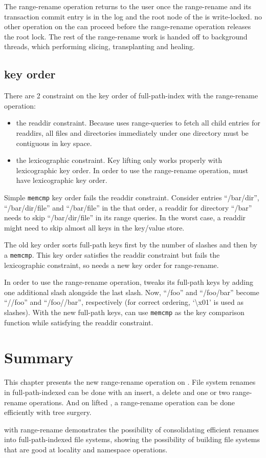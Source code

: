 The range-rename operation returns to the user once the range-rename and its
transaction commit entry is in the log and the root node of the \bet is
write-locked.
no other operation on the \bet can proceed before the range-rename operation
releases the root lock.
The rest of the range-rename work is handed off to background threads, which
performing slicing, transplanting and healing.

\subsection{\betrfs key order}

There are 2 constraint on the key order of full-path-index \betrfs with the
range-rename operation:

\begin{itemize}
\item the readdir constraint. Because \betrfs uses range-queries to fetch all
child entries for readdirs, all files and directories immediately under one
directory must be contiguous in key space.
\item the lexicographic constraint. Key lifting only works properly with
lexicographic key order. In order to use the range-rename operation,
\betrfs must have lexicographic key order.
\end{itemize}

Simple \texttt{memcmp} key order fails the readdir constraint.
Consider entries ``/bar/dir'', ``/bar/dir/file'' and ``/bar/file'' in the that
order, a readdir for directory ``/bar'' needs to skip ``/bar/dir/file'' in
its range queries.
In the worst case, a readdir might need to skip almost all keys in the key/value
store.

The old \betrfs key order sorts full-path keys first by the number of slashes
and then by a \texttt{memcmp}.
This key order satisfies the readdir constraint but fails the lexicographic
constraint, so \betrfs needs a new key order for range-rename.

In order to use the range-rename operation, \betrfs tweaks its full-path keys by
adding one additional slash alongside the last slash.
Now, ``/foo'' and ``/foo/bar'' become ``//foo'' and ``/foo//bar'', respectively
(for correct ordering, `\textbackslash x01' is used as slashes).
With the new full-path keys, \betrfs can use \texttt{memcmp} as the key
comparison function while satisfying the readdir constraint.

\section{Summary}

This chapter presents the new range-rename operation on \bets.
File system renames in full-path-indexed \betrfs can be done with an insert,
a delete and one or two range-rename operations.
And on lifted \bets, a range-rename operation can be done efficiently with
tree surgery.

\betrfs with range-rename demonstrates the possibility of consolidating
efficient renames into full-path-indexed file systems, showing the possibility
of building file systems that are good at locality and namespace operations.

